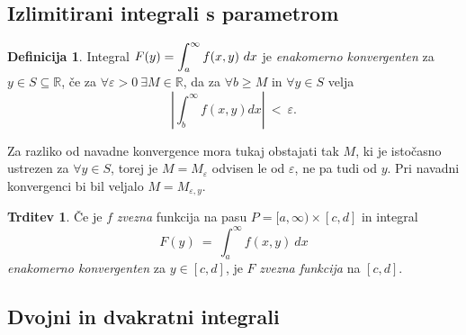 \documentclass[11pt]{article}
\theoremstyle{definition}
\newtheorem{definicija}{Definicija}[section]
\theoremstyle{definition}
\newtheorem{trditev}{Trditev}[section]
\theoremstyle{definition}
\begin{document}

\subsection{Izlimitirani integrali s parametrom}
\vspace{0.5cm}

\begin{definicija}

Integral $F(y) = \mathlarger{\int_{a}^{\infty} f(x, y) ~dx}$ je \textit{enakomerno konvergenten} za $y \in S \subseteq \mathbb{R}$, če za $\forall \varepsilon > 0 ~\exists M \in \mathbb{R}$, da za $\forall b \geq M$ in $\forall y \in S$ velja
$$\left| \int_{b}^{\infty} f(x, y) dx \right| ~<~ \varepsilon.$$ 

Za razliko od navadne konvergence mora tukaj obstajati tak $M$, ki je istočasno ustrezen za $\forall y \in S$, torej je $M = M_{\varepsilon}$ odvisen le od $\varepsilon$, ne pa tudi od $y$. Pri navadni konvergenci bi bil veljalo $M = M_{\varepsilon,y}$.

\end{definicija}
\vspace{0.5cm}

\begin{trditev}

Če je $f$ \textit{zvezna} funkcija na pasu $P = [a, \infty) \times [c, d]$ in integral
$$F(y) ~=~ \int_{a}^{\infty} f(x, y) ~dx$$
\textit{enakomerno konvergenten} za $y \in [c, d]$, je $F$ \textit{zvezna funkcija} na $[c, d]$.

\end{trditev}
\vspace{0.5cm}


\subsection{Dvojni in dvakratni integrali}
\vspace{0.5cm}
\end{document}
